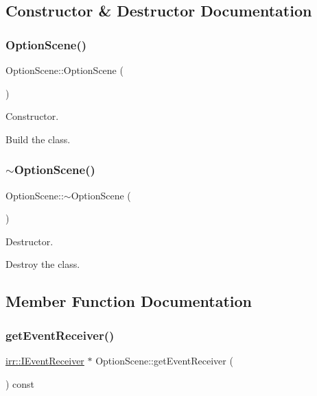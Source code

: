 \subsection{Constructor \& Destructor Documentation}
\mbox{\label{classOptionScene_ac0dfacf1988c5dcfe2520970735fab10}} 
\subsubsection{\texorpdfstring{Option\+Scene()}{OptionScene()}}
{\footnotesize\ttfamily Option\+Scene\+::\+Option\+Scene (\begin{DoxyParamCaption}{ }\end{DoxyParamCaption})}



Constructor. 

Build the class. \mbox{\label{classOptionScene_ab8de71400c4ed7f2a47cedfedb13f327}} 
\subsubsection{\texorpdfstring{$\sim$\+Option\+Scene()}{~OptionScene()}}
{\footnotesize\ttfamily Option\+Scene\+::$\sim$\+Option\+Scene (\begin{DoxyParamCaption}{ }\end{DoxyParamCaption})}



Destructor. 

Destroy the class. 

\subsection{Member Function Documentation}
\mbox{\label{classOptionScene_a8848b9040ee7fd9c1d05a22181c5e053}} 
\subsubsection{\texorpdfstring{get\+Event\+Receiver()}{getEventReceiver()}}
{\footnotesize\ttfamily \hyperlink{classirr_1_1IEventReceiver}{irr\+::\+I\+Event\+Receiver} $\ast$ Option\+Scene\+::get\+Event\+Receiver (\begin{DoxyParamCaption}{ }\end{DoxyParamCaption}) const\hspace{0.3cm}{\ttfamily [virtual]}}



